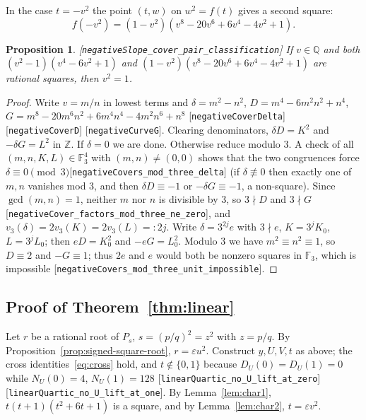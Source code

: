 \documentclass[10pt]{article}
\newtheorem{proposition}[theorem]{Proposition}
\theoremstyle{definition}
\theoremstyle{remark}
\newcommand{\Q}{\mathbb{Q}}
\newcommand{\Z}{\mathbb{Z}}
\newcommand{\F}{\mathbb{F}}
\newcommand{\leanref}[1]{{\scriptsize\textup{[\texttt{#1}]}}\allowbreak}
\begin{document}
In the case $t=-v^2$ the point $(t,w)$ on $w^2=f(t)$ gives a second square:
\begin{equation}\label{eq:fneg}
 f(-v^2)=(1-v^2)(v^8-20v^6+6v^4-4v^2+1).
\end{equation}

\begin{proposition}\label{prop:Dminus}
\leanref{negative\allowbreak Slope\_\allowbreak cover\_\allowbreak pair\_\allowbreak classification}
If $v\in\Q$ and both $(v^2-1)(v^4-6v^2+1)$ and
$(1-v^2)(v^8-20v^6+6v^4-4v^2+1)$ are rational squares, then $v^2=1$.
\end{proposition}

\begin{proof}
Write $v=m/n$ in lowest terms and
$\delta=m^2-n^2$, $D=m^4-6m^2n^2+n^4$, $G=m^8-20m^6n^2+6m^4n^4-4m^2n^6+n^8$
\leanref{negative\allowbreak Cover\allowbreak Delta} \leanref{negative\allowbreak Cover\allowbreak D} \leanref{negative\allowbreak Curve\allowbreak G}.
Clearing denominators, $\delta D=K^2$ and $-\delta G=L^2$ in $\Z$.  If
$\delta=0$ we are done.  Otherwise reduce modulo $3$.  A check of all
$(m,n,K,L)\in\F_3^4$ with $(m,n)\ne(0,0)$ shows that the two congruences force
$\delta\equiv0\pmod3$\leanref{negative\allowbreak Covers\_\allowbreak mod\_\allowbreak three\_\allowbreak delta}
(if $\delta\not\equiv0$ then exactly one of $m,n$ vanishes mod $3$, and then
$\delta D\equiv-1$ or $-\delta G\equiv-1$, a non-square).  Since
$\gcd(m,n)=1$, neither $m$ nor $n$ is divisible by $3$, so $3\nmid D$ and
$3\nmid G$\leanref{negative\allowbreak Cover\_\allowbreak factors\_\allowbreak mod\_\allowbreak three\_\allowbreak ne\_\allowbreak zero}, and
$v_3(\delta)=2v_3(K)=2v_3(L)=:2j$.  Write $\delta=3^{2j}e$ with $3\nmid e$,
$K=3^jK_0$, $L=3^jL_0$; then $eD=K_0^2$ and $-eG=L_0^2$.  Modulo $3$ we have
$m^2\equiv n^2\equiv1$, so $D\equiv2$ and $-G\equiv1$; thus $2e$ and $e$ would
both be nonzero squares in $\F_3$, which is impossible
\leanref{negative\allowbreak Covers\_\allowbreak mod\_\allowbreak three\_\allowbreak unit\_\allowbreak impossible}.
\end{proof}

\subsection{Proof of Theorem~\ref{thm:linear}}

Let $r$ be a rational root of $P_s$, $s=(p/q)^2=z^2$ with $z=p/q$.  By
Proposition~\ref{prop:signed-square-root}, $r=\varepsilon u^2$.  Construct
$y,U,V,t$ as above; the cross identities~\eqref{eq:cross} hold, and
$t\notin\{0,1\}$ because $D_U(0)=D_U(1)=0$ while $N_U(0)=4$, $N_U(1)=128$
\leanref{linear\allowbreak Quartic\_\allowbreak no\_\allowbreak U\_\allowbreak lift\_\allowbreak at\_\allowbreak zero} \leanref{linear\allowbreak Quartic\_\allowbreak no\_\allowbreak U\_\allowbreak lift\_\allowbreak at\_\allowbreak one}.
By Lemma~\ref{lem:char1}, $t(t+1)(t^2+6t+1)$ is a square, and by
Lemma~\ref{lem:char2}, $t=\varepsilon v^2$.
\end{document}

